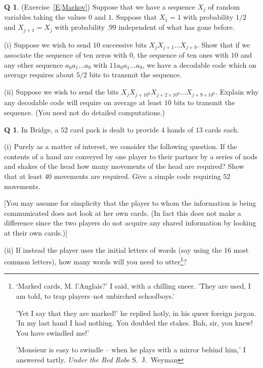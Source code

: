 \documentclass[12pt,a4paper]{article}
\theoremstyle{plain}
\theoremstyle{definition}
\newtheorem{question}[theorem]{Q}
\begin{document}
    \begin{question}
        \label{C1.7}
        (Exercise~\ref{E;Markov})
        Suppose that we have a sequence
        $X_{j}$ of random variables taking the values
        $0$ and $1$. Suppose that $X_{1}=1$ with probability $1/2$
        and
        $X_{j+1}=X_{j}$ with probability
        $.99$ independent of what has gone before.

        (i) Suppose we wish to send $10$ successive bits
        $X_{j}X_{j+1}\dots X_{j+9}$. Show that if we associate
        the sequence of ten zeros with $0$, the sequence
        of ten ones with $10$ and any other sequence
        $a_{0}a_{1}\dots a_{9}$ with $11a_{0}a_{1}\dots a_{9}$,
        we have a decodable code which on average requires
        about $5/2$ bits to transmit the sequence.

        (ii) Suppose we wish to send the bits
        $X_{j}X_{j+10^{6}}X_{j+2\times 10^{6}}\dots X_{j+9\times 10^{6}}$.
        Explain why any decodable code will require
        on average at least $10$ bits to transmit the sequence.
        (You need not do detailed computations.)
    \end{question}

    \begin{question}
        \label{C1.8}
        In Bridge, a $52$ card pack is dealt
        to provide $4$ hands of $13$ cards each.

        (i) Purely as
        a matter of interest, we consider the following question.
        If the contents of a hand are conveyed by one player
        to their partner by a series of nods and shakes of the head
        how many movements of the head are required?
        Show that at least $40$ movements are required.
        Give a simple code requiring $52$ movements.

        $[$You may assume for simplicity that the player to
        whom the information is being communicated does not
        look at her own cards. (In fact this does not make
        a difference since the two players do not acquire
        any shared information by looking at their
        own cards.)$]$



        (ii) If instead the player uses the initial letters
        of words (say using the $16$ most common letters),
        how many words will you
        need to utter\footnote{`Marked cards, M. l'Anglais?' I said,
        with a chilling sneer. 'They are used, I am told,
        to trap players--not unbirched schoolboys.'

        'Yet I say that they are marked!'
        he replied hotly, in his queer foreign jargon.
        'In my last hand I had nothing. You doubled the stakes.
        Bah, sir, you knew! You have swindled me!'

        'Monsieur is easy to swindle
        -- when he plays with a mirror behind him,'
        I answered tartly. \emph{Under the Red Robe} S.~J.~Weyman}?
    \end{question}
\end{document}
